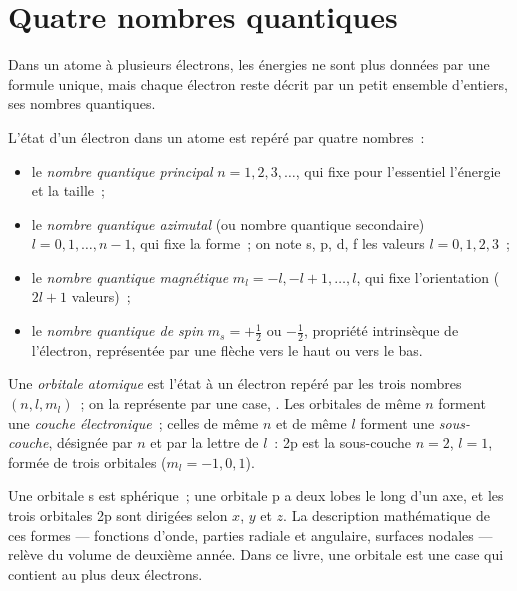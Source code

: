 \section{Quatre nombres quantiques}

Dans un atome à plusieurs électrons, les énergies ne sont plus données
par une formule unique, mais chaque électron reste décrit par un petit
ensemble d'entiers, ses nombres quantiques.

\begin{definition}\label{def:b1:quantum-numbers:quantum-number}
L'état d'un électron dans un atome est repéré par quatre nombres~:
\begin{itemize}
  \item le \emph{nombre quantique principal}
        $n = 1, 2, 3, \dots$, qui fixe pour l'essentiel l'énergie et la taille~;
  \item le \emph{nombre quantique azimutal}
        (ou nombre quantique secondaire) $l = 0, 1, \dots, n-1$, qui fixe
        la forme~; on note s, p, d, f les valeurs $l = 0, 1, 2, 3$~;
  \item le \emph{nombre quantique magnétique}
        $m_l = -l, -l+1, \dots, l$, qui fixe l'orientation ($2l + 1$
        valeurs)~;
  \item le \emph{nombre quantique de spin}
        $m_s = +\tfrac12$ ou $-\tfrac12$, propriété intrinsèque de
        l'électron, représentée par une flèche vers le haut ou vers le bas.
\end{itemize}
\end{definition}

\begin{definition}\label{def:b1:quantum-numbers:orbital}
Une \emph{orbitale atomique} est l'état à un
électron repéré par les trois nombres $(n, l, m_l)$~; on la représente
par une case, \omorbs{}. Les orbitales de même $n$ forment une
\emph{couche électronique}~; celles de même $n$ et de même $l$ forment une
\emph{sous-couche}, désignée par $n$ et par la lettre de $l$~:
2p est la sous-couche $n = 2$, $l = 1$, formée de trois orbitales
($m_l = -1, 0, 1$).
\end{definition}

\begin{remark}[Formes]\label{rem:b1:quantum-numbers:shapes}
Une orbitale s est sphérique~; une orbitale p a deux lobes le long d'un
axe, et les trois orbitales 2p sont dirigées selon $x$, $y$ et $z$. La
description mathématique de ces formes --- fonctions d'onde, parties
radiale et angulaire, surfaces nodales --- relève du volume de deuxième
année. Dans ce livre, une orbitale est une case qui contient au plus deux
électrons.
\end{remark}

